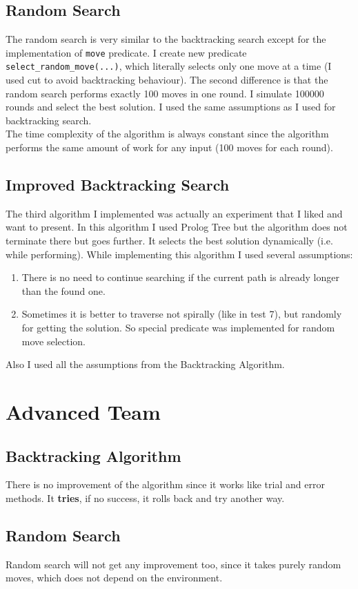 \documentclass{article}
\begin{document}
\subsection{Random Search}
The random search is very similar to the backtracking search except for the implementation of \texttt{move} predicate. I create new predicate \texttt{select\_random\_move(...)}, which literally selects only one move at a time (I used cut to avoid backtracking behaviour). The second difference is that the random search performs exactly 100 moves in one round. I simulate 100000 rounds and select the best solution. I used the same assumptions as I used for backtracking search.\\
The time complexity of the algorithm is always constant since the algorithm performs the same amount of work for any input (100 moves for each round). 

\subsection{Improved Backtracking Search}
The third algorithm I implemented was actually an experiment that I liked and want to present. In this algorithm I used Prolog Tree but the algorithm does not terminate there but goes further. It selects the best solution dynamically (i.e. while performing). While implementing this algorithm I used several assumptions:
\begin{enumerate}
	\item There is no need to continue searching if the current path is already longer than the found one.
	\item Sometimes it is better to traverse not spirally (like in test 7), but randomly for getting the solution. So special predicate was implemented for random move selection.
\end{enumerate}
Also I used all the assumptions from the Backtracking Algorithm.

\section{Advanced Team}
\subsection{Backtracking Algorithm}
There is no improvement of the algorithm since it works like trial and error methods. It \textbf{tries}, if no success, it rolls back and try another way. 
\subsection{Random Search}
Random search will not get any improvement too, since it takes purely random moves, which does not depend on the environment.
\end{document}
